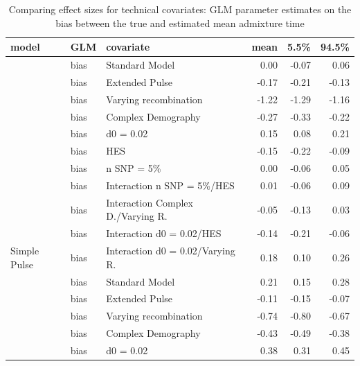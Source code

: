 \documentclass[11pt]{article}
\begin{document}
\begin{table}[H]

\caption{\label{tab:table_Supplements_ests_bias}Comparing effect sizes for technical covariates: GLM parameter estimates on the bias between the true and estimated mean admixture time}
\centering

\begin{tabular}[t]{l|l|l|r|r|r}
\hline
model & GLM & covariate & mean & 5.5\% & 94.5\%\\
\hline
 & bias & Standard Model & 0.00 & -0.07 & 0.06\\

 & bias & Extended Pulse & -0.17 & -0.21 & -0.13\\

 & bias & Varying recombination & -1.22 & -1.29 & -1.16\\

 & bias & Complex Demography & -0.27 & -0.33 & -0.22\\

 & bias & d0 = 0.02 & 0.15 & 0.08 & 0.21\\

 & bias & HES & -0.15 & -0.22 & -0.09\\

 & bias & n SNP = 5\% & 0.00 & -0.06 & 0.05\\

 & bias & Interaction n SNP = 5\%/HES & 0.01 & -0.06 & 0.09\\

 & bias & Interaction Complex D./Varying R. & -0.05 & -0.13 & 0.03\\

 & bias & Interaction d0 = 0.02/HES & -0.14 & -0.21 & -0.06\\

\multirow{-11}{*}{\raggedright\arraybackslash Simple Pulse} & bias & Interaction d0 = 0.02/Varying R. & 0.18 & 0.10 & 0.26\\
\cline{1-6}
 & bias & Standard Model & 0.21 & 0.15 & 0.28\\

 & bias & Extended Pulse & -0.11 & -0.15 & -0.07\\

 & bias & Varying recombination & -0.74 & -0.80 & -0.67\\

 & bias & Complex Demography & -0.43 & -0.49 & -0.38\\

 & bias & d0 = 0.02 & 0.38 & 0.31 & 0.45\\


\end{tabular}
\end{table}
\end{document}
